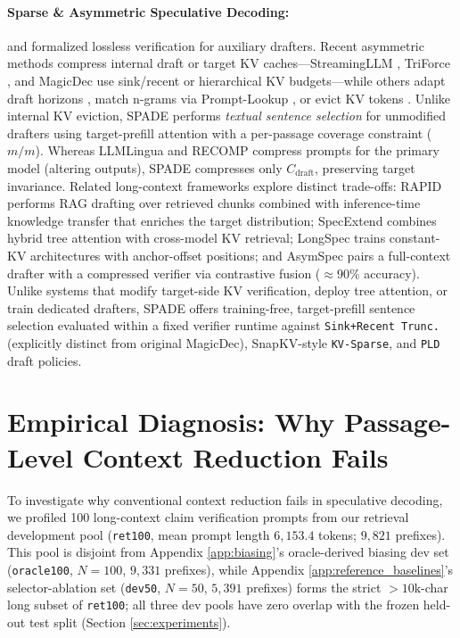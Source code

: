 \documentclass[11pt]{article}
\begin{document}
\paragraph{Sparse \& Asymmetric Speculative Decoding:}
\citet{leviathan2023fast} and \citet{chen2023accelerating} formalized lossless verification for auxiliary drafters. Recent asymmetric methods compress internal draft or target KV caches---StreamingLLM \citep{xiao2024streamingllm}, TriForce \citep{sun2024triforce}, and MagicDec \citep{chen2024magicdec} use sink/recent or hierarchical KV budgets---while others adapt draft horizons \citep{zhang2025draftstop,wang2026linguaspec}, match n-grams via Prompt-Lookup \citep{saxena2023promptlookup}, or evict KV tokens \citep{li2024snapkv}. Unlike internal KV eviction, SPADE performs \textit{textual sentence selection} for unmodified drafters using target-prefill attention with a per-passage coverage constraint ($m/m$). Whereas LLMLingua \citep{jiang2023llmlingua} and RECOMP \citep{xu2023recomp} compress prompts for the primary model (altering outputs), SPADE compresses only $C_{\text{draft}}$, preserving target invariance. Related long-context frameworks explore distinct trade-offs: RAPID \citep{chen2025rapid} performs RAG drafting over retrieved chunks combined with inference-time knowledge transfer that enriches the target distribution; SpecExtend \citep{cha2025specextend} combines hybrid tree attention with cross-model KV retrieval; LongSpec \citep{yang2025longspec} trains constant-KV architectures with anchor-offset positions; and AsymSpec \citep{liang2026asymspec} pairs a full-context drafter with a compressed verifier via contrastive fusion ($\approx 90\%$ accuracy). Unlike systems that modify target-side KV verification, deploy tree attention, or train dedicated drafters, SPADE offers training-free, target-prefill sentence selection evaluated within a fixed verifier runtime against \texttt{Sink+Recent Trunc.} \citep{xiao2024streamingllm} (explicitly distinct from original MagicDec), SnapKV-style \texttt{KV-Sparse}, and \texttt{PLD} draft policies.

\section{Empirical Diagnosis: Why Passage-Level Context Reduction Fails}
\label{sec:diagnosis}

To investigate why conventional context reduction fails in speculative decoding, we profiled 100 long-context claim verification prompts from our retrieval development pool (\texttt{ret100}, mean prompt length $6,153.4$ tokens; $9,821$ prefixes). This pool is disjoint from Appendix \ref{app:biasing}'s oracle-derived biasing dev set (\texttt{oracle100}, $N=100$, $9,331$ prefixes), while Appendix \ref{app:reference_baselines}'s selector-ablation set (\texttt{dev50}, $N=50$, $5,391$ prefixes) forms the strict $>10\text{k}$-char long subset of \texttt{ret100}; all three dev pools have zero overlap with the frozen held-out test split (Section \ref{sec:experiments}).
\end{document}

